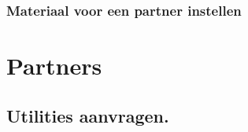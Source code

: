 \documentclass[]{memoir}
\begin{document}
\subsubsection{Materiaal voor een partner instellen} \label{AddPartnerMaterial}

\section{Partners} \label{PartnerInstr}
\subsection{Utilities aanvragen.} \label{RequestMaterial}
\end{document}
